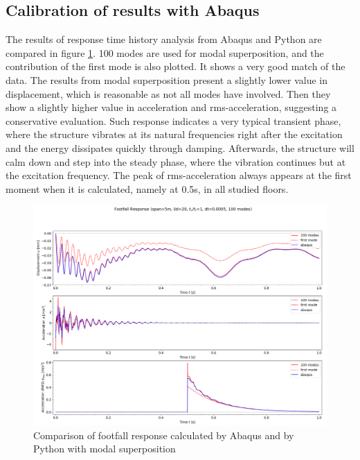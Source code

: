 \subsection{Calibration of results with Abaqus}
The results of response time history analysis from Abaqus and Python are compared in figure \ref{fig:response_abq}. 100 modes are used for modal superposition, and the contribution of the first mode is also plotted. It shows a very good match of the data. The results from modal superposition present a slightly lower value in displacement, which is reasonable as not all modes have involved. Then they show a slightly higher value in acceleration and rms-acceleration, suggesting a conservative evaluation. Such response indicates a very typical transient phase, where the structure vibrates at its natural frequencies right after the excitation and the energy dissipates quickly through damping. Afterwards, the structure will calm down and step into the steady phase, where the vibration continues but at the excitation frequency. The peak of rms-acceleration always appears at the first moment when it is calculated, namely at 0.5s, in all studied floors.

\begin{figure}[H]
\centering
\includegraphics[width=1\textwidth]{images/response_abq.png}
\caption{Comparison of footfall response calculated by Abaqus and by Python with modal superposition}
\label{fig:response_abq}
\end{figure}

